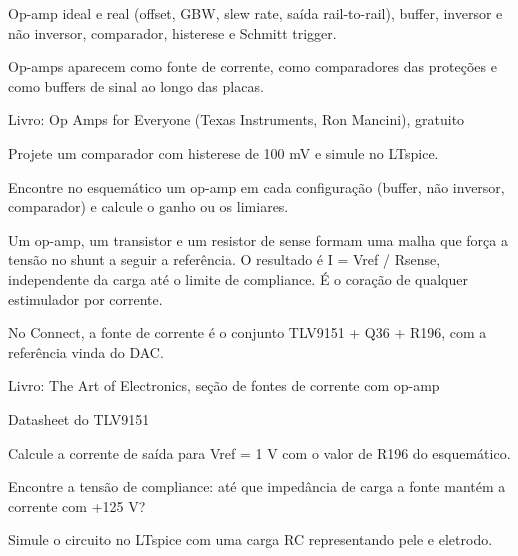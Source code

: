 
Op-amp ideal e real (offset, GBW, slew rate, saída rail-to-rail), buffer, inversor e não inversor, comparador, histerese e Schmitt trigger.

\begin{noproduto}
Op-amps aparecem como fonte de corrente, como comparadores das proteções e como buffers de sinal ao longo das placas.
\end{noproduto}

\begin{paraestudar}
  \item Livro: Op Amps for Everyone (Texas Instruments, Ron Mancini), gratuito
  \item {}
\end{paraestudar}

\begin{pratique}
  \item Projete um comparador com histerese de 100 mV e simule no LTspice.
  \item Encontre no esquemático um op-amp em cada configuração (buffer, não inversor, comparador) e calcule o ganho ou os limiares.
\end{pratique}

Um op-amp, um transistor e um resistor de sense formam uma malha que força a tensão no shunt a seguir a referência. O resultado é I = Vref / Rsense, independente da carga até o limite de compliance. É o coração de qualquer estimulador por corrente.

\begin{noproduto}
No Connect, a fonte de corrente é o conjunto TLV9151 + Q36 + R196, com a referência vinda do DAC.
\end{noproduto}

\begin{paraestudar}
  \item Livro: The Art of Electronics, seção de fontes de corrente com op-amp
  \item Datasheet do TLV9151
\end{paraestudar}

\begin{pratique}
  \item Calcule a corrente de saída para Vref = 1 V com o valor de R196 do esquemático.
  \item Encontre a tensão de compliance: até que impedância de carga a fonte mantém a corrente com +125 V?
  \item Simule o circuito no LTspice com uma carga RC representando pele e eletrodo.
\end{pratique}

